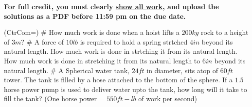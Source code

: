 \documentclass[11pt]{book}
\begin{document}
\thispagestyle{fancy}
\noindent	\textbf{For full credit, you must clearly \underline{show all work}, and upload the solutions as a PDF before 11:59 pm on the due date.}\hfill
\vspace{0.3in}
\begin{easylist}
\ListProperties(CtrCom=\fbox)
# How much work is done when a hoist lifts a \(200kg\) rock to a height of \(3m\)?
\vspace{0.5in}
# A force of \(10lb\) is required to hold a spring strtched \(4in\) beyond its natural length. How much work is done in strtching it from its natural length. How much work is done in stretching it from its natural length to \(6in\) beyond its natural length. 
\vspace{0.5in}
# A Spherical water tank, $24ft$ in diameter, sits atop of \(60ft\) tower. The tank is filled by a hose attached to the bottom of the sphere. If a \(1.5\) horse power pump is used to deliver water upto the tank, how long will it take to fill the tank? (One horse power = \(550ft-lb\) of work per second)
 \end{easylist}
\end{document}
